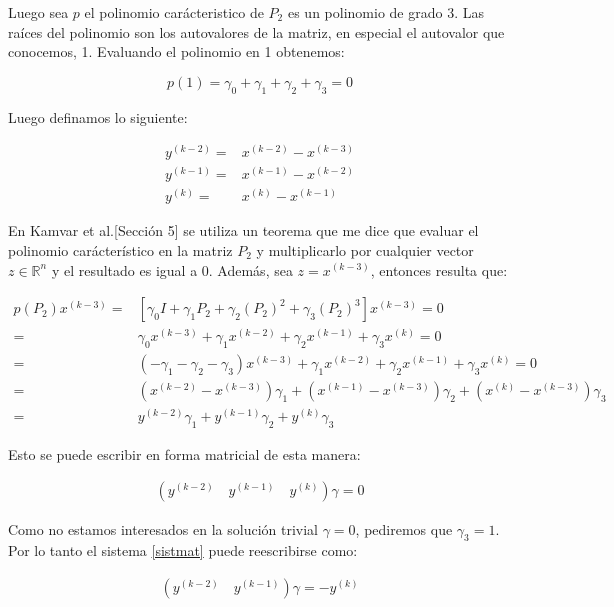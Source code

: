 Luego sea $p$ el polinomio car\'acteristico de $P_{2}$ es un polinomio de grado 3. Las ra\'ices del polinomio son los autovalores de la matriz, en especial el autovalor que conocemos, 1. Evaluando el polinomio en 1 obtenemos:

\[
	p(1) = \gamma_{0} + \gamma_{1} + \gamma_{2} + \gamma_{3} = 0
\]

Luego definamos lo siguiente:

\begin{align*}
	y^{(k-2)} =& x^{(k-2)}- x^{(k-3)} \\
	y^{(k-1)} =& x^{(k-1)}- x^{(k-2)}\\
	y^{(k)} =& x^{(k)}- x^{(k-1)}
\end{align*}

En Kamvar et al.[Secci\'on 5]\cite{Kamvar2003} se utiliza un teorema que me dice que evaluar el polinomio car\'acter\'istico en la matriz $P_{2}$ y multiplicarlo por cualquier vector $z \in \mathbb{R}^{n}$ y el resultado es igual a 0. Adem\'as, sea $z = x^{(k-3)}$, entonces resulta que:

\begin{align*}
	p(P_{2})x^{(k-3)}	=& [\gamma_{0}I + \gamma_{1}P_{2} + \gamma_{2}(P_{2})^{2} + \gamma_{3}(P_{2})^{3}]x^{(k-3)} = 0 \\
						=& \gamma_{0}x^{(k-3)} + \gamma_{1}x^{(k-2)} + \gamma_{2}x^{(k-1)} + \gamma_{3}x^{(k)}= 0 \\
						=& (- \gamma_{1} - \gamma_{2} - \gamma_{3})x^{(k-3)} + \gamma_{1}x^{(k-2)} + \gamma_{2}x^{(k-1)} + \gamma_{3}x^{(k)}= 0 \\
						=& (x^{(k-2)}- x^{(k-3)})\gamma_{1} + (x^{(k-1)}- x^{(k-3)})\gamma_{2} + (x^{(k)}- x^{(k-3)})\gamma_{3}\\
						=& y^{(k-2)}\gamma_{1} + y^{(k-1)}\gamma_{2} + y^{(k)}\gamma_{3}
\end{align*}

Esto se puede escribir en forma matricial de esta manera:

\begin{align}
	\left(y^{(k-2)} \quad  y^{(k-1)} \quad  y^{(k)}\right)\gamma = 0 \label{sistmat}
\end{align}

Como no estamos interesados en la soluci\'on trivial $\gamma = 0$, pediremos que $\gamma_{3} = 1$. Por lo tanto el sistema \eqref{sistmat} puede reescribirse como:

\begin{align}
	\left(y^{(k-2)} \quad y^{(k-1)}\right)\gamma = - y^{(k)} \label{sistmat2}
\end{align}

